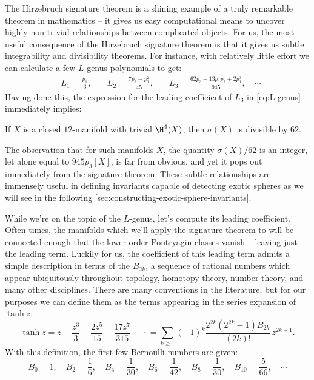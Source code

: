 The Hirzebruch signature theorem is a shining example of a truly remarkable theorem in mathematics -- it gives us easy computational means to uncover highly non-trivial relationships between complicated objects. For us, the most useful consequence of the Hirzebruch signature theorem is that it gives us subtle integrability and divisibility theorems. For instance, with relatively little effort we can calculate a few $L$-genus polynomials to get:
\begin{equation}\label{eq:L-genus}
	\begin{aligned}
		 & L_1 = \frac{p_1}{3},\quad
		 & L_2 = \frac{7p_2 - p_1^2}{45},\quad
		 & L_3 = \frac{62p_3 - 13p_1p_2 + 2p_1^3}{945},\quad\cdots
	\end{aligned}
\end{equation}
Having done this, the expression for the leading coefficient of $L_3$ in \cref{eq:L-genus} immediately implies:
\begin{corollary}
	If $X$ is a closed $12$-manifold with trivial $\H^4(X)$, then $\sigma(X)$ is divisible by $62$.
\end{corollary}
The observation that for such manifolds $X$, the quantity $\sigma(X)/62$ is an integer, let alone equal to $945p_3[X]$, is far from obvious, and yet it pops out immediately from the signature theorem. These subtle relationships are immensely useful in defining invariants capable of detecting exotic spheres as we will see in the following \cref{sec:constructing-exotic-sphere-invariants}.

While we're on the topic of the $L$-genus, let's compute its leading coefficient. Often times, the manifolds which we'll apply the signature theorem to will be connected enough that the lower order Pontryagin classes vanish -- leaving just the leading term.
Luckily for us, the coefficient of this leading term admits a simple description in terms of the  $B_{2k}$, a sequence of rational numbers which appear ubiquitously throughout topology, homotopy theory, number theory, and many other disciplines. There are many conventions in the literature, but for our purposes we can define them as the terms appearing in the series expansion of $\tanh z$:
\begin{equation}\label{eq:tanh_series}
	\tanh z = z - \frac{z^3}{3} + \frac{2z^5}{15} - \frac{17z^7}{315}+\cdots = \sum_{k\geq 1} (-1)^k\frac{2^{2k}(2^{2k}-1)B_{2k}}{(2k)!}\, z^{2k-1}.
\end{equation}
With this definition, the first few Bernoulli numbers are given:
\begin{equation}\label{eq:bernoulli_numbers}
	B_0 = 1,\quad B_2 = \frac{1}{6},\quad B_4 = \frac{1}{30},\quad B_6=\frac{1}{42},\quad B_{8}=\frac{1}{30},\quad B_{10} = \frac{5}{66},\quad\cdots
\end{equation}

